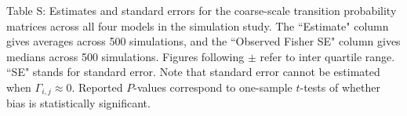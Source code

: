 \documentclass{article}
\begin{document}
        \noindent Table S: Estimates and standard errors for the coarse-scale transition probability matrices across all four models in the simulation study. The ``Estimate" column gives averages across 500 simulations, and the ``Observed Fisher SE" column gives medians across 500 simulations. Figures following $\pm$ refer to inter quartile range. ``SE" stands for standard error. Note that standard error cannot be estimated when $\Gamma_{i,j} \approx 0$. Reported $P$-values correspond to one-sample $t$-tests of whether bias is statistically significant.
        \addtocounter{tablenum}{1}
        
        \newpage
        
        \begin{center}
\end{center}
\end{document}

